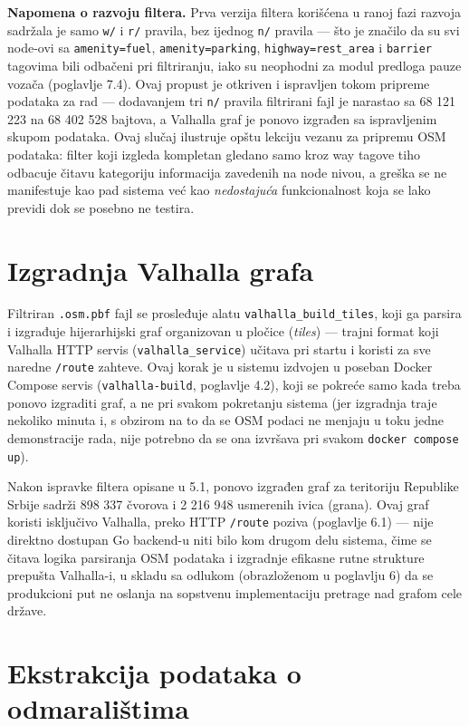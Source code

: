 \textbf{Napomena o razvoju filtera.} Prva verzija filtera korišćena u ranoj fazi razvoja sadržala je samo \texttt{w/} i \texttt{r/} pravila, bez ijednog \texttt{n/} pravila — što je značilo da su svi node-ovi sa \texttt{amenity=fuel}, \texttt{amenity=parking}, \texttt{highway=rest\_area} i \texttt{barrier} tagovima bili odbačeni pri filtriranju, iako su neophodni za modul predloga pauze vozača (poglavlje 7.4). Ovaj propust je otkriven i ispravljen tokom pripreme podataka za rad — dodavanjem tri \texttt{n/} pravila filtrirani fajl je narastao sa 68 121 223 na 68 402 528 bajtova, a Valhalla graf je ponovo izgrađen sa ispravljenim skupom podataka. Ovaj slučaj ilustruje opštu lekciju vezanu za pripremu OSM podataka: filter koji izgleda kompletan gledano samo kroz way tagove tiho odbacuje čitavu kategoriju informacija zavedenih na node nivou, a greška se ne manifestuje kao pad sistema već kao \emph{nedostajuća} funkcionalnost koja se lako previdi dok se posebno ne testira.

\section{Izgradnja Valhalla grafa}

Filtriran \texttt{.osm.pbf} fajl se prosleđuje alatu \texttt{valhalla\_build\_tiles}, koji ga parsira i izgrađuje hijerarhijski graf organizovan u pločice (\emph{tiles}) — trajni format koji Valhalla HTTP servis (\texttt{valhalla\_service}) učitava pri startu i koristi za sve naredne \texttt{/route} zahteve. Ovaj korak je u sistemu izdvojen u poseban Docker Compose servis (\texttt{valhalla-build}, poglavlje 4.2), koji se pokreće samo kada treba ponovo izgraditi graf, a ne pri svakom pokretanju sistema (jer izgradnja traje nekoliko minuta i, s obzirom na to da se OSM podaci ne menjaju u toku jedne demonstracije rada, nije potrebno da se ona izvršava pri svakom \texttt{docker compose up}).

Nakon ispravke filtera opisane u 5.1, ponovo izgrađen graf za teritoriju Republike Srbije sadrži 898 337 čvorova i 2 216 948 usmerenih ivica (grana). Ovaj graf koristi isključivo Valhalla, preko HTTP \texttt{/route} poziva (poglavlje 6.1) — nije direktno dostupan Go backend-u niti bilo kom drugom delu sistema, čime se čitava logika parsiranja OSM podataka i izgradnje efikasne rutne strukture prepušta Valhalla-i, u skladu sa odlukom (obrazloženom u poglavlju 6) da se produkcioni put ne oslanja na sopstvenu implementaciju pretrage nad grafom cele države.

\section{Ekstrakcija podataka o odmaralištima}

